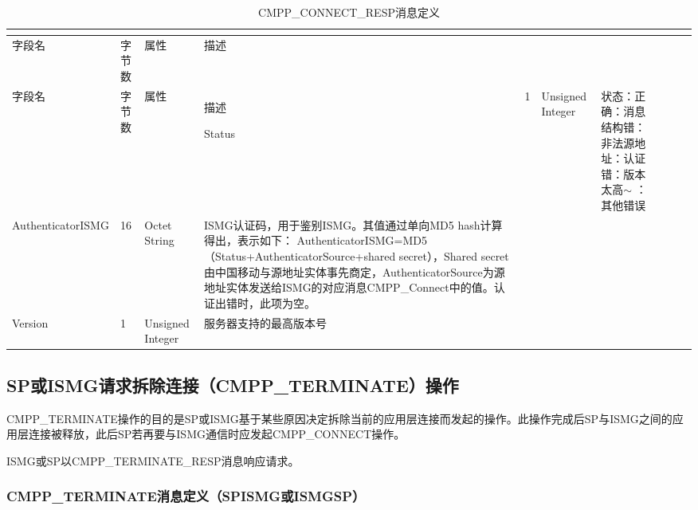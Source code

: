\documentclass[11pt]{book} %
\begin{document}
\begin{longtable}{|m{90pt}|m{35pt}|m{80pt}|m{200pt}|}
\tabularnewline\hline
字段名&字节数&属性&描述
\endhead

\caption{CMPP\_CONNECT\_RESP消息定义}\\
\hline
字段名&字节数&属性&描述
\endfirsthead

\endfoot

\endlastfoot

\hline
Status&1&Unsigned Integer&状态：正确：消息结构错：非法源地址：认证错：版本太高$\sim$ ：其他错误\\
\hline
AuthenticatorISMG& 16& Octet String& ISMG认证码，用于鉴别ISMG。\newline 其值通过单向MD5 hash计算得出，表示如下：\newline 
AuthenticatorISMG=MD5（Status+AuthenticatorSource+shared secret），Shared secret 由中国移动与源地址实体事先商定，AuthenticatorSource为源地址实体发送给ISMG的对应消息CMPP\_Connect中的值。\newline 认证出错时，此项为空。\\
\hline
Version& 1& Unsigned Integer& 服务器支持的最高版本号\\
\hline
\end{longtable}

\subsection{SP或ISMG请求拆除连接（CMPP\_TERMINATE）操作}

CMPP\_TERMINATE操作的目的是SP或ISMG基于某些原因决定拆除当前的应用层连接而发起的操作。此操作完成后SP与ISMG之间的应用层连接被释放，此后SP若再要与ISMG通信时应发起CMPP\_CONNECT操作。

ISMG或SP以CMPP\_TERMINATE\_RESP消息响应请求。


\subsubsection{CMPP\_TERMINATE消息定义（SP\textrightarrow ISMG或ISMG\textrightarrow SP）}
\end{document}
